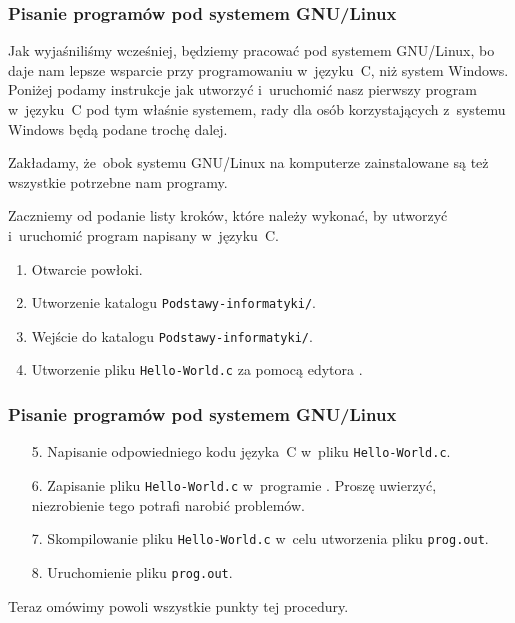 \documentclass[10pt,t]{beamer}
\begin{document}
\begin{frame}
  \frametitle{Pisanie programów pod systemem GNU/Linux}


  Jak wyjaśniliśmy wcześniej, będziemy pracować pod systemem GNU/Linux,
  bo daje nam lepsze wsparcie przy programowaniu w~języku~C, niż system
  Windows. Poniżej podamy instrukcje jak utworzyć i~uruchomić nasz pierwszy
  program w~języku~C pod tym właśnie systemem, rady dla osób korzystających
  z~systemu Windows będą podane trochę dalej.

  Zakładamy, że~obok systemu GNU/Linux na komputerze zainstalowane są też
  wszystkie potrzebne nam programy.

  Zaczniemy od podanie listy kroków, które należy wykonać, by utworzyć
  i~uruchomić program napisany w~języku~C.

  \begin{enumerate}

  \item Otwarcie powłoki.

  \item Utworzenie katalogu \texttt{Podstawy-informatyki/}.

  \item Wejście do katalogu \texttt{Podstawy-informatyki/}.

  \item Utworzenie pliku \texttt{Hello-World.c} za pomocą edytora
    .

  \end{enumerate}

\end{frame}





\begin{frame}
  \frametitle{Pisanie programów pod systemem GNU/Linux}


  \begin{enumerate}

  \item[5.] Napisanie odpowiedniego kodu języka~C w~pliku
    \texttt{Hello-World.c}.

  \item[6.] Zapisanie pliku \texttt{Hello-World.c} w~programie
    .
    Proszę uwierzyć, niezrobienie tego potrafi narobić problemów.

  \item[7.] Skompilowanie pliku \texttt{Hello-World.c} w~celu utworzenia
    pliku \texttt{prog.out}.

  \item[8.] Uruchomienie pliku \texttt{prog.out}.

  \end{enumerate}

  Teraz omówimy powoli wszystkie punkty tej procedury.

\end{frame}
\end{document}
